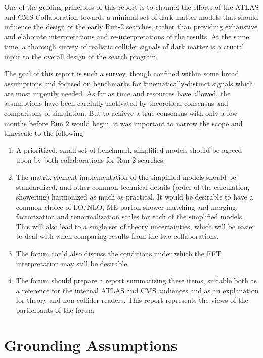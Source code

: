 One of the guiding principles of this report is to channel the efforts
of the ATLAS and CMS Collaboration towards a minimal set of dark
matter models that should influence the design of the early Run-2
searches, rather than providing exhaustive and elaborate
interpretations and re-interpretations of the results. At the same
time, a thorough survey of realistic collider signals of dark matter
is a crucial input to the overall design of the search program.

The goal of this report is such a survey, though confined within some
broad assumptions and focused on benchmarks for kinematically-distinct
signals which are most urgently needed. As far as time and resources
have allowed, the assumptions have been carefully motivated by
theoretical consensus and comparisons of simulation. But to achieve a
true consensus with only a few months before Run 2 would begin, it was
important to narrow the scope and timescale to the following:

\begin{enumerate}
\item A prioritized, small set of benchmark simplified models should
  be agreed upon by both collaborations for Run-2 searches.
\item The matrix element implementation of the simplified models
  should be standardized, and other common technical details (order of
  the calculation, showering) harmonized as much as practical. It
  would be desirable to have a common choice of LO/NLO, ME-parton
  shower matching and merging, factorization and renormalization
  scales for each of the simplified models. This will also lead to a
  single set of theory uncertainties, which will be easier to deal
  with when comparing results from the two collaborations.
\item The forum could also discuss the conditions under which the EFT
  interpretation may still be desirable.
\item The forum should prepare a report summarizing these items,
  suitable both as a reference for the internal ATLAS and CMS
  audiences and as an explanation for theory and non-collider
  readers. This report represents the views of the participants of the
  forum.
\end{enumerate}

\section{Grounding Assumptions}

